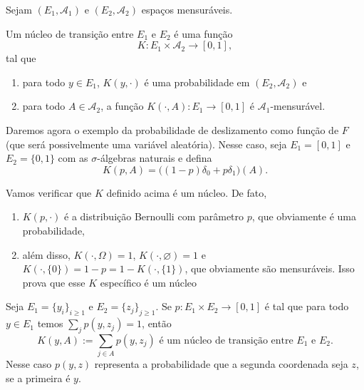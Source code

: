 Sejam $(E_1, \mathcal{A}_1)$ e $(E_2, \mathcal{A}_2)$ espaços mensuráveis.
\begin{definition}
  Um núcleo de transição entre $E_1$ e $E_2$ é uma função 
  \begin{equation}
    K: E_1 \times \mathcal{A}_2 \to [0,1],
  \end{equation}
  tal que
  \begin{enumerate}[\quad a)]
  \item para todo $y \in E_1$, $K(y,\cdot)$ é uma probabilidade em $(E_2, \mathcal{A}_2)$ e
  \item para todo $A \in \mathcal{A}_2$, a função $K(\cdot, A): E_1 \to [0,1]$ é $\mathcal{A}_1$-mensurável.
  \end{enumerate}
\end{definition}

\begin{example}
  \label{x:chance_deslizamento}
  Daremos agora o exemplo da probabilidade de deslizamento como função de $F$ (que será possivelmente uma variável aleatória).
  Nesse caso, seja $E_1 = [0,1]$ e $E_2 = \{0,1\}$ com as $\sigma$-álgebras naturais e defina
  \begin{equation}
    K(p, A) = \big( (1-p)\delta_0 + p \delta_1 \big) (A).
  \end{equation}
\end{example}

Vamos verificar que $K$ definido acima é um núcleo.
De fato,
\begin{enumerate}[\quad i)]
\item $K(p, \cdot)$ é a distribuição Bernoulli com parâmetro $p$, que obviamente é uma probabilidade,
\item além disso, $K(\cdot, \Omega) = 1$, $K(\cdot, \varnothing) = 1$ e $K(\cdot, \{0\}) = 1-p = 1 - K(\cdot,\{1\})$, que obviamente são mensuráveis.
Isso prova que esse $K$ específico é um núcleo
\end{enumerate}

\begin{example}[Discreto]
  \label{x:nucleo_discreto}
  Seja $E_1 = \{y_i\}_{i \geq 1}$ e $E_2 = \{z_j\}_{j \geq 1}$.
  Se $p: E_1 \times E_2 \to [0,1]$ é tal que para todo $y \in E_1$ temos $\sum_{j} p(y, z_j) = 1$, então
  \begin{equation}
    K(y, A) := \sum_{j \in A} p(y, z_j) \text{ é um núcleo de transição entre $E_1$ e $E_2$.}
  \end{equation}
  Nesse caso $p(y,z)$ representa a probabilidade que a segunda coordenada seja $z$, se a primeira é $y$.
\end{example}

